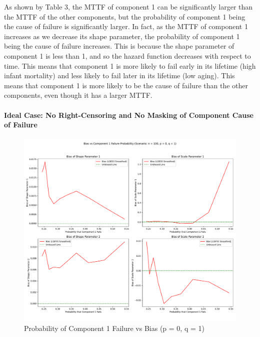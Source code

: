 \documentclass[
]{article}
\begin{document}
As shown by Table 3, the MTTF of component 1 can be significantly larger
than the MTTF of the other components, but the probability of component
1 being the cause of failure is significantly larger. In fact, as the
MTTF of component 1 increases as we decrease its shape parameter, the
probability of component 1 being the cause of failure increases. This is
because the shape parameter of component 1 is less than 1, and so the
hazard function decreases with respect to time. This means that
component 1 is more likely to fail early in its lifetime (high infant
mortality) and less likely to fail later in its lifetime (low aging).
This means that component 1 is more likely to be the cause of failure
than the other components, even though it has a larger MTTF.

\hypertarget{ideal-case-no-right-censoring-and-no-masking-of-component-cause-of-failure}{%
\paragraph{Ideal Case: No Right-Censoring and No Masking of Component
Cause of
Failure}\label{ideal-case-no-right-censoring-and-no-masking-of-component-cause-of-failure}}

\begin{figure}

{\centering \includegraphics{image/loess_smoothed_n_100_p_0_q_1_probs_0.0_-_0.55} 

}

\caption{Probability of Component 1 Failure vs Bias (p = 0, q = 1)}\label{fig:n100-p0-q1}
\end{figure}
\end{document}
